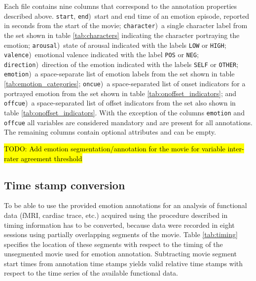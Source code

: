 Each file contains nine columns that correspond to the annotation properties
described above. \texttt{start}, \texttt{end})~start and end time of an emotion
episode, reported in seconds from the start of the movie; \texttt{character})~a
single character label from the set shown in table \ref{tab:characters}
indicating the character portraying the emotion; \texttt{arousal})~state of
arousal indicated with the labels \texttt{LOW} or \texttt{HIGH};
\texttt{valence})~emotional valence indicated with the label \texttt{POS} or
\texttt{NEG}; \texttt{direction})~direction of the emotion indicated with the
labels \texttt{SELF} or \texttt{OTHER}; \texttt{emotion})~a space-separate list
of emotion labels from the set shown in table \ref{tab:emotion_categories};
\texttt{oncue})~a space-separated list of onset indicators for a portrayed
emotion from the set shown in table \ref{tab:onoffset_indicators}; and
\texttt{offcue})~a space-separated list of offset indicators from the set also
shown in table \ref{tab:onoffset_indicators}.  With the exception of the columns
\texttt{emotion} and \texttt{offcue} all variables are considered mandatory
and are present for all annotations. The remaining columns contain optional
attributes and can be empty.

\hl{TODO: Add emotion segmentation/annotation for the movie for variable
inter-rater agreement threshold}

\subsection*{Time stamp conversion}

To be able to use the provided emotion annotations for an analysis of
functional data (fMRI, cardiac trace, etc.) acquired using the
procedure described in~\cite{HBI+14} timing information has to be converted,
because data were recorded in eight sessions using partially overlapping
segments of the movie. Table \ref{tab:timing} specifies the location of these
segments with respect to the timing of the unsegmented movie used for emotion
annotation. Subtracting movie segment start times from annotation time stamps
yields valid relative time stamps with respect to the time series of the
available functional data.

